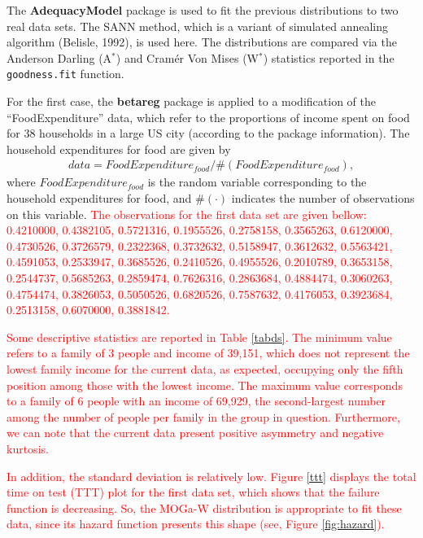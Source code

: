 \documentclass[twoside,leqno,11pt]{article}
\begin{document}
The {\bf AdequacyModel} package is used to fit the 
previous distributions to two real data sets. The SANN method, which is a variant of simulated annealing algorithm (Belisle, 1992), is used here. The distributions are compared 
via the Anderson Darling (A$^{*}$) and Cram\'er Von Mises (W$^{*}$) statistics reported in the {\tt goodness.fit} function.

For the first case, the {\bf betareg} package is applied to a modification of the ``FoodExpenditure'' data, which refer to 
the proportions of income spent on food for 38 households 
in a large US city (according to the package information). The household expenditures for food are given by
\begin{eqnarray*}
data = FoodExpenditure_{food} / \#(FoodExpenditure_{food}),
\end{eqnarray*}
where $FoodExpenditure_{food}$ is the random variable 
corresponding to the household expenditures for food, and $\#(\cdot)$ indicates the number of observations on this variable. \textcolor{red}{The observations for the first data set are given bellow:\\
  0.4210000, 0.4382105, 0.5721316, 0.1955526, 0.2758158, 0.3565263,
  0.6120000, 0.4730526, 0.3726579, 0.2322368, 0.3732632, 0.5158947,
  0.3612632, 0.5563421, 0.4591053, 0.2533947, 0.3685526, 0.2410526,
  0.4955526, 0.2010789, 0.3653158, 0.2544737, 0.5685263, 0.2859474,
  0.7626316, 0.2863684, 0.4884474, 0.3060263, 0.4754474, 0.3826053,
  0.5050526, 0.6820526, 0.7587632, 0.4176053, 0.3923684, 0.2513158,
  0.6070000, 0.3881842.}
  
\textcolor{red}{Some descriptive statistics are reported in Table \ref{tabds}. The minimum value refers to a family of 3 people and income of 39,151, which does not represent the lowest family 
income for the current data, as expected, occupying only the 
fifth position among those with the lowest income. The maximum value corresponds to a family of 6 people with an income of 69,929, the second-largest number among the number of people per family in the group in question. Furthermore, we can note that the current data  present positive asymmetry and negative kurtosis.}

\textcolor{red}{In addition, the standard deviation is relatively low. Figure \ref{ttt} displays the total time on test (TTT) plot for the first data set, which shows that the failure function is decreasing. So, the MOGa-W distribution is appropriate to fit 
these data, since its  hazard function presents this shape (see,  Figure \ref{fig:hazard}).}
\end{document}

